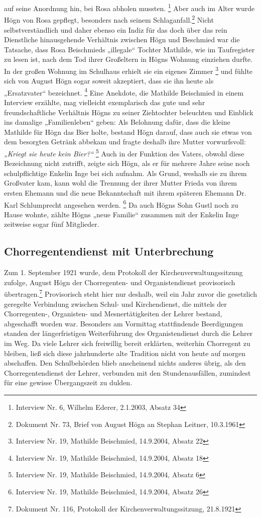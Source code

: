 \documentclass[a4paper]{article}
\newcommand\textstyleZitate[1]{\textit{#1}}
\begin{document}
auf seine Anordnung hin, bei Rosa abholen mussten. \footnote{Interview
Nr. 6, Wilhelm Ederer, 2.1.2003, Absatz 34} Aber auch im Alter wurde
Högn von Rosa gepflegt, besonders nach seinem Schlaganfall.\footnote{
Dokument Nr. 73, Brief von August Högn an Stephan Leitner, 10.3.1961}
Nicht selbstverständlich und daher ebenso ein Indiz für das doch über
das rein Dienstliche hinausgehende Verhältnis zwischen Högn und
Beschmied war die Tatsache, dass Rosa Beischmieds „illegale“ Tochter
Mathilde, wie im Taufregister zu lesen ist, nach dem Tod ihrer
Großeltern in Högns Wohnung einziehen durfte. In der großen Wohnung im
Schulhaus erhielt sie ein eigenes Zimmer \footnote{Interview Nr. 19,
Mathilde Beischmied, 14.9.2004, Absatz 22} und fühlte sich von August
Högn sogar soweit akzeptiert, dass sie ihn heute als „Ersatzvater“
bezeichnet. \footnote{Interview Nr. 19, Mathilde Beischmied, 14.9.2004,
Absatz 18} Eine Anekdote, die Mathilde Beischmied in einem Interview
erzählte, mag vielleicht exemplarisch das gute und sehr
freundschaftliche Verhältnis Högns zu seiner Ziehtochter beleuchten und
Einblick ins damalige „Familienleben“ geben: Als Belohnung dafür, dass
die kleine Mathilde für Högn das Bier holte, bestand Högn darauf, dass
auch sie etwas von dem besorgten Getränk abbekam und fragte deshalb
ihre Mutter vorwurfsvoll: \textstyleZitate{„Kriegt sie heute kein
Bier?“ } \footnote{Interview Nr. 19, Mathilde Beischmied, 14.9.2004,
Absatz 6} Auch in der Funktion des Vaters, obwohl diese Bezeichnung
nicht zutrifft, zeigte sich Högn, als er für mehrere Jahre seine noch
schulpflichtige Enkelin Inge bei sich aufnahm. Als Grund, weshalb sie
zu ihrem Großvater kam, kann wohl die Trennung der ihrer Mutter Frieda
von ihrem ersten Ehemann und die neue Bekanntschaft mit ihrem späteren
Ehemann Dr. Karl Schlumprecht angesehen werden. \footnote{Interview Nr.
19, Mathilde Beischmied, 14.9.2004, Absatz 26} Da auch Högns Sohn Gustl
noch zu Hause wohnte, zählte Högns „neue Familie“ zusammen mit der
Enkelin Inge zeitweise sogar fünf Mitglieder.

\subsection{Chorregentendienst mit Unterbrechung}
\hypertarget{RefHeadingToc100333732}{}Zum 1. September 1921 wurde, dem
Protokoll der Kirchenverwaltungssitzung zufolge, August Högn der
Chorregenten- und Organistendienst provisorisch übertragen.\footnote{
Dokument Nr. 116, Protokoll der Kirchenverwaltungssitzung, 21.8.1921}
Provisorisch steht hier nur deshalb, weil ein Jahr zuvor die gesetzlich
geregelte Verbindung zwischen Schul- und Kirchendienst, die mittels der
Chorregenten-, Organisten- und Mesnertätigkeiten der Lehrer bestand,
abgeschafft worden war. Besonders am Vormittag stattfindende
Beerdigungen standen der längerfristigen Weiterführung des
Organistendienst durch die Lehrer im Weg. Da viele Lehrer sich
freiwillig bereit erklärten, weiterhin Chorregent zu bleiben, ließ sich
diese jahrhunderte alte Tradition nicht von heute auf morgen
abschaffen. Den Schulbehörden blieb anscheinend nichts anderes übrig,
als den Chorregentendienst der Lehrer, verbunden mit den
Stundenausfällen, zumindest für eine gewisse Übergangszeit zu dulden.
\end{document}
